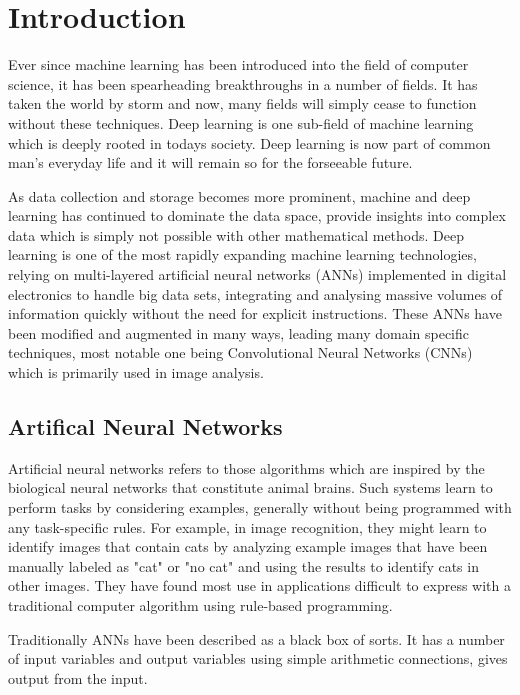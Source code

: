 \chapter{Introduction}
\hspace{3mm}

Ever since machine learning has been introduced into the field of computer science, it has been spearheading breakthroughs in a number of fields. It has taken the world by storm and now, many fields will simply cease to function without these techniques. Deep learning is one sub-field of machine learning which is deeply rooted in todays society. Deep learning is now part of common man's everyday life and it will remain so for the forseeable future.

As data collection and storage becomes more prominent, machine and deep learning has continued to dominate the data space, provide insights into complex data which is simply not possible with other mathematical methods. Deep learning is one of the most rapidly expanding machine learning technologies, relying on multi-layered artificial neural networks (ANNs) implemented in digital electronics to handle big data sets, integrating and analysing massive volumes of information quickly without the need for explicit instructions. These ANNs have been modified and augmented in many ways, leading many domain specific techniques, most notable one being Convolutional Neural Networks (CNNs) which is primarily used in image analysis.

\section{Artifical Neural Networks}

Artificial neural networks refers to those algorithms which are inspired by the biological neural networks that constitute animal brains. Such systems learn to perform tasks by considering examples, generally without being programmed with any task-specific rules. For example, in image recognition, they might learn to identify images that contain cats by analyzing example images that have been manually labeled as "cat" or "no cat" and using the results to identify cats in other images. They have found most use in applications difficult to express with a traditional computer algorithm using rule-based programming.

Traditionally ANNs have been described as a black box of sorts. It has a number of input variables and output variables using simple arithmetic connections, gives output from the input.

